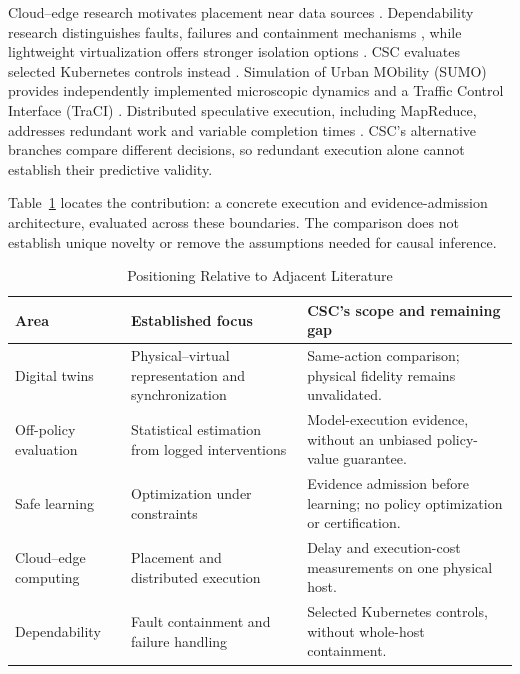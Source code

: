 \documentclass[conference,letterpaper]{IEEEtran}
\begin{document}
Cloud--edge research motivates placement near data sources
\cite{shi2016edge,satyanarayanan2017edge}. Dependability research distinguishes
faults, failures and containment mechanisms \cite{avizienis2004dependable}, while
lightweight virtualization offers stronger isolation options
\cite{agache2020firecracker}. CSC evaluates selected Kubernetes controls instead
\cite{k8s-networkpolicy,k8s-securitycontext,k8s-resources,k8s-images}.
Simulation of Urban MObility (SUMO) provides independently implemented microscopic dynamics and a Traffic
Control Interface (TraCI) \cite{sumo2018}. Distributed speculative execution,
including MapReduce, addresses redundant work and variable completion times
\cite{dean2004mapreduce}. CSC's alternative branches compare different decisions,
so redundant execution alone cannot establish their predictive validity.

Table~\ref{tab:literature-positioning} locates the contribution: a concrete
execution and evidence-admission architecture, evaluated across these boundaries.
The comparison does not establish unique novelty or remove the assumptions
needed for causal inference.
\begin{table}[t]
\caption{Positioning Relative to Adjacent Literature}
\label{tab:literature-positioning}
\centering
\begin{tabular}{@{}>{\raggedright\arraybackslash}p{}>{\raggedright\arraybackslash}p{}>{\raggedright\arraybackslash}p{}@{}}
\toprule
Area & Established focus & CSC's scope and remaining gap \\
\midrule
Digital twins & Physical--virtual representation and synchronization & Same-action comparison; physical fidelity remains unvalidated. \\
Off-policy evaluation & Statistical estimation from logged interventions & Model-execution evidence, without an unbiased policy-value guarantee. \\
Safe learning & Optimization under constraints & Evidence admission before learning; no policy optimization or certification. \\
Cloud--edge computing & Placement and distributed execution & Delay and execution-cost measurements on one physical host. \\
Dependability & Fault containment and failure handling & Selected Kubernetes controls, without whole-host containment. \\
\bottomrule
\end{tabular}
\end{table}
\end{document}
